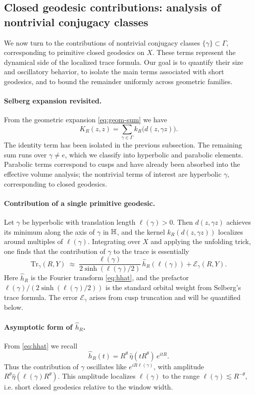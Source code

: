 \subsection{Closed geodesic contributions: analysis of nontrivial conjugacy classes}\label{subsec:geom-geodesic}

We now turn to the contributions of nontrivial conjugacy classes $\{\gamma\}\subset\Gamma$, corresponding to primitive 
closed geodesics on $X$. These terms represent the dynamical side of the localized trace formula. Our goal is to 
quantify their size and oscillatory behavior, to isolate the main terms associated with short geodesics, and to bound 
the remainder uniformly across geometric families. 

\paragraph{Selberg expansion revisited.}
From the geometric expansion \eqref{eq:geom-sum} we have
\[
K_R(z,z) = \sum_{\gamma\in\Gamma} k_R\!\big(d(z,\gamma z)\big).
\]
The identity term has been isolated in the previous subsection. The remaining sum runs over $\gamma\neq e$, which we 
classify into hyperbolic and parabolic elements. Parabolic terms correspond to cusps and have already been absorbed into 
the effective volume analysis; the nontrivial terms of interest are hyperbolic $\gamma$, corresponding to closed 
geodesics. 

\paragraph{Contribution of a single primitive geodesic.}
Let $\gamma$ be hyperbolic with translation length $\ell(\gamma)>0$. Then $d(z,\gamma z)$ achieves its minimum along the 
axis of $\gamma$ in $\mathbb{H}$, and the kernel $k_R(d(z,\gamma z))$ localizes around multiples of $\ell(\gamma)$. Integrating 
over $X$ and applying the unfolding trick, one finds that the contribution of $\gamma$ to the trace is essentially 
\[
\mathrm{Tr}_\gamma(R,Y) \;\approx\; \frac{\ell(\gamma)}{2\sinh(\ell(\gamma)/2)} \, \widehat{h}_R(\ell(\gamma)) + \mathcal{E}_\gamma(R,Y).
\]
Here $\widehat{h}_R$ is the Fourier transform \eqref{eq:hhat}, and the prefactor $\ell(\gamma)/(2\sinh(\ell(\gamma)/2))$ 
is the standard orbital weight from Selberg's trace formula. The error $\mathcal{E}_\gamma$ arises from cusp truncation 
and will be quantified below. 

\paragraph{Asymptotic form of $\widehat{h}_R$.}
From \eqref{eq:hhat} we recall
\[
\widehat{h}_R(t) = R^\theta \,\widehat{\eta}(t R^\theta) \, e^{i t R}.
\]
Thus the contribution of $\gamma$ oscillates like $e^{i R \ell(\gamma)}$, with amplitude $R^\theta 
\widehat{\eta}(\ell(\gamma) R^\theta)$. This amplitude localizes $\ell(\gamma)$ to the range $\ell(\gamma)\lesssim 
R^{-\theta}$, i.e. short closed geodesics relative to the window width. 

